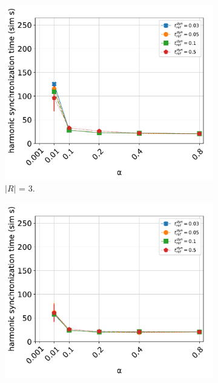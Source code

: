 		\begin{figure}[ht!]
		  \begin{subfigure}[b]{0.5\textwidth}
			\centering\captionsetup{width=.9\linewidth}%
			\includegraphics[width=\textwidth]{Assets/DocSegments/Chapters/ExperimentsAndResults/Figures/PerfScores/t_ref_dyn_x_alpha_hyperparamtuning_experiment_plot_collsize3.pdf}
			\caption{$|R|$ = 3.}
			\label{fig:sub:t_ref_dyn_x_alpha_collsize3}
		  \end{subfigure}
		  \begin{subfigure}[b]{0.5\textwidth}
			\centering\captionsetup{width=.9\linewidth}%
			\includegraphics[width=\textwidth]{Assets/DocSegments/Chapters/ExperimentsAndResults/Figures/PerfScores/t_ref_dyn_x_alpha_hyperparamtuning_experiment_plot_collsize10.pdf}

\end{subfigure}
\end{figure}
